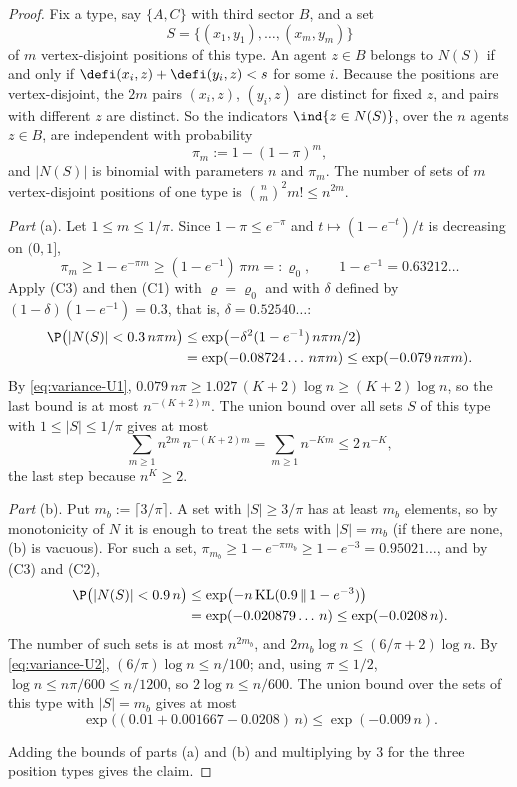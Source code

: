 \begin{proof}
Fix a type, say $\{A,C\}$ with third sector $B$, and a set
\[
S=\{(x_1,y_1),\dots,(x_m,y_m)\}
\]
of $m$ vertex-disjoint positions of this type. An agent
$z\in B$ belongs to $N(S)$ if and only if $\defi(x_i,z)+\defi(y_i,z)<s$ for some $i$.
Because the positions are vertex-disjoint, the $2m$ pairs $(x_i,z)$, $(y_i,z)$ are distinct
for fixed $z$, and pairs with different $z$ are distinct. So the indicators
$\ind\{z\in N(S)\}$, over the $n$ agents $z\in B$, are independent with probability
\[
\pi_m:=1-(1-\pi)^m,
\]
and $|N(S)|$ is binomial with parameters $n$ and $\pi_m$. The number of sets of $m$
vertex-disjoint positions of one type is $\binom nm^2m!\le n^{2m}$.

\emph{Part} (a). Let $1\le m\le1/\pi$. Since $1-\pi\le e^{-\pi}$ and
$t\mapsto(1-e^{-t})/t$ is decreasing on $(0,1]$,
\[
\pi_m\ge1-e^{-\pi m}\ge(1-e^{-1})\,\pi m=:\varrho_0,\qquad 1-e^{-1}=0.63212\ldots
\]
Apply (C3) and then (C1) with $\varrho=\varrho_0$ and with $\delta$ defined by
$(1-\delta)(1-e^{-1})=0.3$, that is, $\delta=0.52540\ldots$:
\begin{align*}
\P\bigl(|N(S)|<0.3\,n\pi m\bigr)&\le\exp\bigl(-\delta^2(1-e^{-1})\,n\pi m/2\bigr)\\
&=\exp(-0.08724\ldots\,n\pi m)\le\exp(-0.079\,n\pi m).
\end{align*}
By \eqref{eq:variance-U1}, $0.079\,n\pi\ge1.027\,(K+2)\log n\ge(K+2)\log n$, so the last
bound is at most $n^{-(K+2)m}$. The union bound over all sets $S$ of this type with
$1\le|S|\le1/\pi$ gives at most
\[
\sum_{m\ge1}n^{2m}\,n^{-(K+2)m}=\sum_{m\ge1}n^{-Km}\le2\,n^{-K},
\]
the last step because $n^K\ge2$.

\emph{Part} (b). Put $m_b:=\lceil3/\pi\rceil$. A set with $|S|\ge3/\pi$ has at least $m_b$
elements, so by monotonicity of $N$ it is enough to treat the sets with $|S|=m_b$ (if
there are none, (b) is vacuous). For such a set,
$\pi_{m_b}\ge1-e^{-\pi m_b}\ge1-e^{-3}=0.95021\ldots$, and by (C3) and (C2),
\begin{align*}
\P\bigl(|N(S)|<0.9\,n\bigr)&\le\exp\bigl(-n\,\mathrm{KL}(0.9\,\|\,1-e^{-3})\bigr)\\
&=\exp(-0.020879\ldots\,n)\le\exp(-0.0208\,n).
\end{align*}
The number of such sets is at most $n^{2m_b}$, and
$2m_b\log n\le(6/\pi+2)\log n$. By \eqref{eq:variance-U2}, $(6/\pi)\log n\le n/100$; and,
using $\pi\le1/2$, $\log n\le n\pi/600\le n/1200$, so $2\log n\le n/600$. The union bound
over the sets of this type with $|S|=m_b$ gives at most
\[
\exp\bigl((0.01+0.001667-0.0208)\,n\bigr)\le\exp(-0.009\,n).
\]

Adding the bounds of parts (a) and (b) and multiplying by $3$ for the three position types
gives the claim.
\end{proof}

